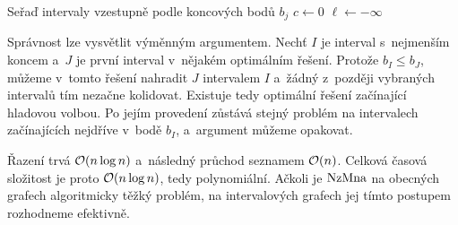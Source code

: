 \begin{algorithm}
    \caption{\textsc{rozvrhování}}
    \label{alg:rozvrhovani}
    Seřaď intervaly vzestupně podle koncových bodů $b_j$\;
    $c\gets 0$
    $\ell\gets-\infty$
    \;
\end{algorithm}

Správnost lze vysvětlit výměnným argumentem. Nechť $I$ je interval s~nejmenším koncem a~$J$ je první interval v~nějakém optimálním řešení. Protože $b_I\leqslant b_J$, můžeme v~tomto řešení nahradit $J$ intervalem $I$ a~žádný z~později vybraných intervalů tím nezačne kolidovat. Existuje tedy optimální řešení začínající hladovou volbou. Po jejím provedení zůstává stejný problém na intervalech začínajících nejdříve v~bodě $b_I$, a~argument můžeme opakovat.

Řazení trvá $\mathcal{O}(n\log n)$ a~následný průchod seznamem $\mathcal{O}(n)$. Celková časová složitost je proto $\mathcal{O}(n\log n)$, tedy polynomiální. Ačkoli je \ensuremath{\NZMNA} na obecných grafech algoritmicky těžký problém, na intervalových grafech jej tímto postupem rozhodneme efektivně.


